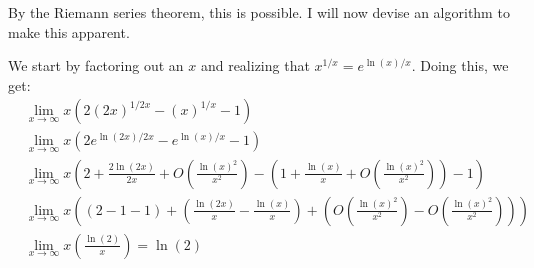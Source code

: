 \documentclass{report}
\begin{document}
\sol 


\sol By the Riemann series theorem, this is possible. I will now devise an algorithm to make this apparent.

\sol We start by factoring out an $x$ and realizing that $x^{1/x} = e^{\ln(x)/x}$. Doing this, we get:
\begin{align*}
    &\lim_{x \to \infty} x (2(2x)^{1/2x} - (x)^{1/x} - 1) \\
    &\lim_{x \to \infty} x(2e^{\ln(2x)/2x} - e^{\ln(x)/x} - 1) \\
    &\lim_{x \to \infty} x \left(2 + \frac{2\ln(2x)}{2x} + O\left(\frac{\ln(x)^2}{x^2}\right) - \left(1 + \frac{\ln(x)}{x} + O\left(\frac{\ln(x)^2}{x^2}\right)\right) - 1\right) \\
    &\lim_{x \to \infty} x \left((2 - 1 - 1) + \left(\frac{\ln(2x)}{x} - \frac{\ln(x)}{x}\right) + \left(O\left(\frac{\ln(x)^2}{x^2}\right) - O\left(\frac{\ln(x)^2}{x^2}\right)\right)\right) \\
    &\lim_{x \to \infty} x\left(\frac{\ln(2)}{x}\right) = \ln(2)
\end{align*}
\end{document}
